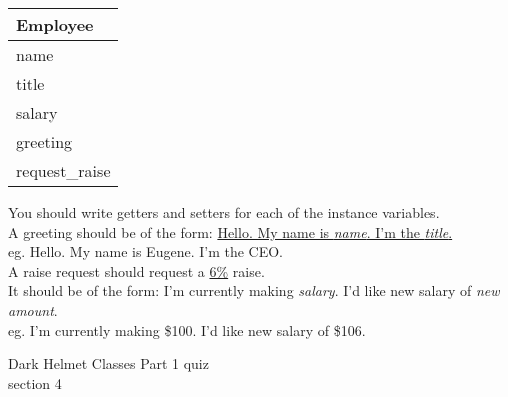 \documentclass{article}
\newcommand{\tab}{\hspace*{0.25in}}
\begin{document}
\begin{enumerate}
\begin{minipage}{.4\textwidth}
		\vspace*{1em}
		\begin{tabular}{|l|}
			\hline Employee\\ \hline
			name\\ title\\ salary\\ \hline
			greeting\\ request\_raise \\  \hline
		\end{tabular}
	\end{minipage}

	\vspace*{2ex}
	You should write getters and setters for each of the instance variables.\\

	A greeting should be of the form: \underline{Hello.  My name is \textit{name}.  
	I'm the \textit{title}.}\\
	\tab \tab eg. Hello.  My name is Eugene.  I'm the CEO.\\

	A raise request should request a \underline{6\%} raise.\\  It should be of the form: 
	I'm currently making \textit{salary}.  I'd like new salary of \textit{new amount}.\\
	\tab \tab eg. I'm currently making \$100.  I'd like new salary of \$106.\\



\end{enumerate}
\pagebreak
Dark Helmet \hfill Classes Part 1 quiz\\
section 4\\
\end{document}
